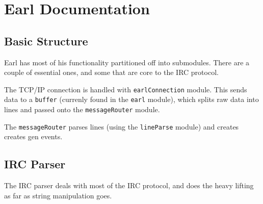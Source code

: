 \documentclass[12pt]{article}
\begin{document}
\section*{Earl Documentation}

\subsection*{Basic Structure}

Earl has most of his functionality partitioned off into submodules. There are a
couple of essential ones, and some that are core to the IRC protocol.

The TCP/IP connection is handled with \texttt{earlConnection} module. This sends
data to a \texttt{buffer} (currenly found in the \texttt{earl} module), which
splits raw data into lines and passed onto the \texttt{messageRouter} module.

The \texttt{messageRouter} parses lines (using the \texttt{lineParse} module)
and creates creates gen events.

\subsection*{IRC Parser}

The IRC parser deals with most of the IRC protocol, and does the heavy lifting
as far as string manipulation goes.
\end{document}
